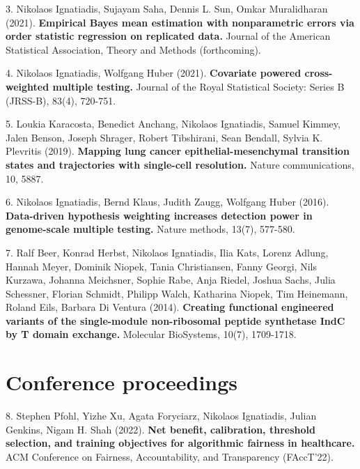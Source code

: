 \documentclass[margin,line]{res}
\newenvironment{list1}{
  \begin{list}{\ding{113}}{%
      \setlength{\itemsep}{0in}
      \setlength{\parsep}{0in} \setlength{\parskip}{0in}
      \setlength{\topsep}{0in} \setlength{\partopsep}{0in}
      \setlength{\leftmargin}{0.17in}}}{\end{list}}
\begin{document}
\begin{resume}
\begin{list1}
\item[3.]
Nikolaos Ignatiadis, Sujayam Saha, Dennis L. Sun, Omkar Muralidharan (2021).
\textbf{Empirical Bayes mean estimation with nonparametric errors via order statistic regression on replicated data.}
Journal of the American Statistical Association, Theory and Methods (forthcoming).

\item[4.]
Nikolaos Ignatiadis, Wolfgang Huber (2021).
\textbf{Covariate powered cross-weighted multiple testing.}
Journal of the Royal Statistical Society: Series B (JRSS-B), 83(4), 720-751.

\item[5.]
Loukia Karacosta, Benedict Anchang, Nikolaos Ignatiadis, Samuel Kimmey, Jalen Benson, Joseph Shrager, Robert Tibshirani, Sean Bendall, Sylvia K. Plevritis (2019).
\textbf{Mapping lung cancer epithelial-mesenchymal transition states and trajectories with single-cell resolution.}
Nature communications, 10, 5887.

\item[6.]
Nikolaos Ignatiadis, Bernd Klaus, Judith Zaugg, Wolfgang Huber (2016).
\textbf{Data-driven hypothesis weighting increases detection power in genome-scale multiple testing.}
Nature methods, 13(7), 577-580.

\item[7.]
Ralf Beer, Konrad Herbst, Nikolaos Ignatiadis, Ilia Kats, Lorenz Adlung, Hannah Meyer, Dominik Niopek, Tania Christiansen, Fanny Georgi, Nils Kurzawa, Johanna Meichsner, Sophie Rabe, Anja Riedel, Joshua Sachs, Julia Schessner, Florian Schmidt, Philipp Walch, Katharina Niopek, Tim Heinemann, Roland Eils, Barbara Di Ventura (2014).
\textbf{Creating functional engineered variants of the single-module non-ribosomal peptide synthetase IndC by T domain exchange.}
Molecular BioSystems, 10(7), 1709-1718.

\end{list1}

\section{\sc Conference proceedings}
\begin{list1}

\item[8.]
Stephen Pfohl, Yizhe Xu, Agata Foryciarz, Nikolaos Ignatiadis, Julian Genkins, Nigam H. Shah (2022).
\textbf{Net benefit, calibration, threshold selection, and training objectives for algorithmic fairness in healthcare.}
ACM Conference on Fairness, Accountability, and Transparency (FAccT'22).


\end{list1}
\end{resume}
\end{document}

